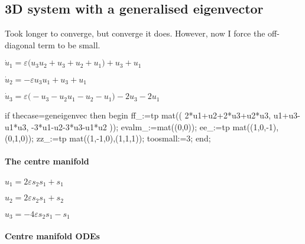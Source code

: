\documentclass[11pt,a5paper]{article}
\begin{document}
\subsection{3D system with a generalised eigenvector}
Took longer to converge, but converge it does.
However, now I force the off-diagonal term to be small.

\begin{math}
\dot u_{1}=\varepsilon  \big(u_{3} u_{2}+u_{3}+u_{2}+u_{1}\big)+u_{3}+u_
{1}
\end{math}\par

\begin{math}
\dot u_{2}=-\varepsilon  u_{3} u_{1}+u_{3}+u_{1}
\end{math}\par

\begin{math}
\dot u_{3}=\varepsilon  \big(-u_{3}-u_{2} u_{1}-u_{2}-u_{1}\big)-2 u_{3}
-2 u_{1}
\end{math}

\begin{reduce}
if thecase=geneigenvec then begin
ff_:=tp mat((
    2*u1+u2+2*u3+u2*u3,
    u1+u3-u1*u3,
    -3*u1-u2-3*u3-u1*u2
    ));
evalm_:=mat((0,0));
ee_:=tp mat((1,0,-1),(0,1,0));
zz_:=tp mat((1,-1,0),(1,1,1));
toosmall:=3;
end;
\end{reduce}

\paragraph{The centre manifold} 

\begin{math}
u_{1}=2 \varepsilon  s_{2} s_{1}+s_{1}
\end{math}\par

\begin{math}
u_{2}=2 \varepsilon  s_{2} s_{1}+s_{2}
\end{math}\par

\begin{math}
u_{3}=-4 \varepsilon  s_{2} s_{1}-s_{1}
\end{math}\par
 
\paragraph{Centre manifold ODEs}
\end{document}
